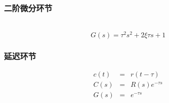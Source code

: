 \documentclass{beamer}
\begin{document}
\begin{frame}
\frametitle{二阶微分环节}
\label{sec-3-8}

　　　$$G(s)=\tau^2s^2+2\xi\tau s + 1$$
\end{frame}
\begin{frame}
\frametitle{延迟环节}
\label{sec-3-9}

\begin{eqnarray*}
c(t) &=& r(t-\tau) \\
C(s) &=& R(s)e^{-\tau s} \\
G(s) &=&e^{-\tau s}
\end{eqnarray*}
\end{frame}
\end{document}
